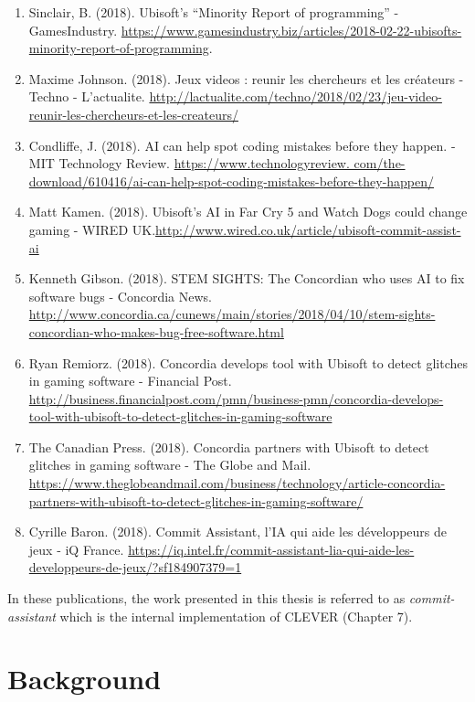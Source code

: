 \documentclass[12pt]{report}
\begin{document}
\begin{enumerate}
\def\labelenumi{\arabic{enumi}.}
\setcounter{enumi}{14}
\item
  Sinclair, B. (2018). Ubisoft's ``Minority Report of programming'' -
  GamesIndustry.
  \url{https://www.gamesindustry.biz/articles/2018-02-22-ubisofts-minority-report-of-programming}.
\item
  Maxime Johnson. (2018). Jeux videos : reunir les chercheurs et les
  créateurs - Techno - L'actualite.
  \url{http://lactualite.com/techno/2018/02/23/jeu-video-reunir-les-chercheurs-et-les-createurs/}
\item
  Condliffe, J. (2018). AI can help spot coding mistakes before they
  happen. - MIT Technology Review. \url{https://www.technologyreview.
  com/the-download/610416/ai-can-help-spot-coding-mistakes-before-they-happen/}
\item
  Matt Kamen. (2018). Ubisoft's AI in Far Cry 5 and Watch Dogs could
  change gaming - WIRED
  UK.\url{http://www.wired.co.uk/article/ubisoft-commit-assist-ai}
\item
  Kenneth Gibson. (2018). STEM SIGHTS: The Concordian who uses AI to fix
  software bugs - Concordia News.
  \url{http://www.concordia.ca/cunews/main/stories/2018/04/10/stem-sights-concordian-who-makes-bug-free-software.html}
\item
  Ryan Remiorz. (2018). Concordia develops tool with Ubisoft to detect
  glitches in gaming software - Financial Post.
  \url{http://business.financialpost.com/pmn/business-pmn/concordia-develops-tool-with-ubisoft-to-detect-glitches-in-gaming-software}
\item
  The Canadian Press. (2018). Concordia partners with Ubisoft to detect
  glitches in gaming software - The Globe and Mail.
  \url{https://www.theglobeandmail.com/business/technology/article-concordia-partners-with-ubisoft-to-detect-glitches-in-gaming-software/}
\item
  Cyrille Baron. (2018). Commit Assistant, l'IA qui aide les
  développeurs de jeux - iQ France.
  \url{https://iq.intel.fr/commit-assistant-lia-qui-aide-les-developpeurs-de-jeux/?sf184907379=1}
\end{enumerate}

In these publications, the work presented in this thesis is referred to
as \emph{commit-assistant} which is the internal implementation of
CLEVER (Chapter 7).

\chapter{Background}\label{background}
\end{document}

